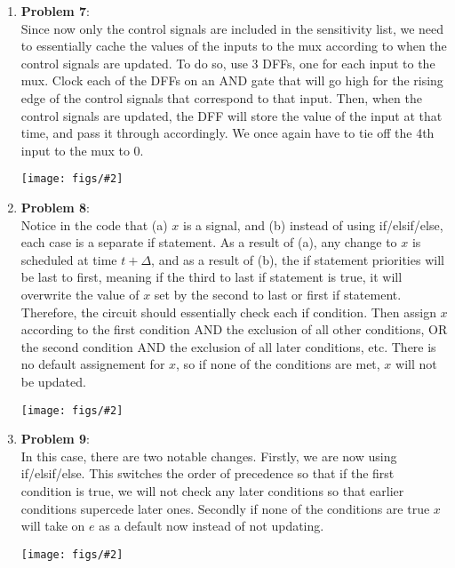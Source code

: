\documentclass{article}
\newcommand{\fig}[2]{
    \begin{center}
        \texttt{[image: figs/\#2]}
    \end{center}
}
\begin{document}
\begin{enumerate}
        \item \textbf{Problem 7}: \\
            Since now only the control signals are included in the sensitivity
            list, we need to essentially cache the values of the inputs to the
            mux according to when the control signals are updated. To do so, use
            3 DFFs, one for each input to the mux. Clock each of the DFFs on an
            AND gate that will go high for the rising edge of the control
            signals that correspond to that input. Then, when the control
            signals are updated, the DFF will store the value of the input at 
            that time, and pass it through accordingly. We once again have to
            tie off the 4th input to the mux to 0.
            \fig{.5}{p7.jpg}

        \item \textbf{Problem 8}: \\
            Notice in the code that (a) $x$ is a signal, and (b) instead of
            using if/elsif/else, each case is a separate if statement. As a
            result of (a), any change to $x$ is scheduled at time $t + \Delta$,
            and as a result of (b), the if statement priorities will be last to
            first, meaning if the third to last if statement is true, it will
            overwrite the value of $x$ set by the second to last or first if
            statement. Therefore, the circuit should essentially check each if
            condition. Then assign $x$ according to the first condition AND 
            the exclusion of all other conditions, OR the second condition AND
            the exclusion of all later conditions, etc. There is no default
            assignement for $x$, so if none of the conditions are met, $x$ will
            not be updated.
            \fig{.5}{p8.jpg}
        \pagebreak

        \item \textbf{Problem 9}: \\
            In this case, there are two notable changes. Firstly, we are now
            using if/elsif/else. This switches the order of precedence so that
            if the first condition is true, we will not check any later
            conditions so that earlier conditions supercede later ones. Secondly
            if none of the conditions are true $x$ will take on $e$ as a default
            now instead of not updating.
            \fig{.5}{p9.jpg}


\end{enumerate}
\end{document}
